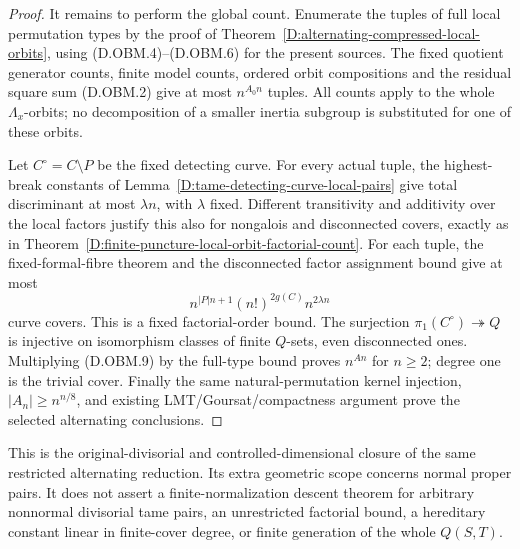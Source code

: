 \begin{proof}
It remains to perform the global count. Enumerate the
tuples of full local permutation types by the proof
of Theorem~\ref{D:alternating-compressed-local-orbits},
using (D.OBM.4)--(D.OBM.6) for the present sources.
The fixed quotient generator counts, finite model
counts, ordered orbit compositions and the residual
square sum (D.OBM.2) give at most $n^{A_0n}$ tuples.
All counts apply to the whole $\Lambda_x$-orbits;
no decomposition of a smaller inertia subgroup is
substituted for one of these orbits.

Let $C^\circ=C\setminus P$ be the fixed detecting
curve. For every actual tuple, the highest-break
constants of
Lemma~\ref{D:tame-detecting-curve-local-pairs}
give total discriminant at most $\lambda n$, with
$\lambda$ fixed. Different transitivity and additivity
over the local factors justify this also for
nongalois and disconnected covers, exactly as in
Theorem~\ref{D:finite-puncture-local-orbit-factorial-count}.
For each tuple, the fixed-formal-fibre theorem and
the disconnected factor assignment bound give at
most
\[
              n^{|P|n+1}(n!)^{2g(C)}n^{2\lambda n}
                                                        \tag{D.OBM.9}
\]
curve covers. This is a fixed factorial-order bound.
The surjection $\pi_1(C^\circ)\twoheadrightarrow Q$
is injective on isomorphism classes of finite
$Q$-sets, even disconnected ones. Multiplying
(D.OBM.9) by the full-type bound proves $n^{An}$
for $n\ge2$; degree one is the trivial cover.
Finally the same natural-permutation kernel
injection, $|A_n|\ge n^{n/8}$, and existing
LMT/Goursat/compactness argument prove the
selected alternating conclusions.
\end{proof}

\begin{remark}
This is the original-divisorial and controlled-dimensional
closure of the same restricted alternating reduction.
Its extra geometric scope concerns normal proper pairs.
It does not assert a finite-normalization descent theorem
for arbitrary nonnormal divisorial tame pairs, an
unrestricted factorial bound, a hereditary constant
linear in finite-cover degree, or finite generation of
the whole $Q(S,T)$.
\end{remark}
